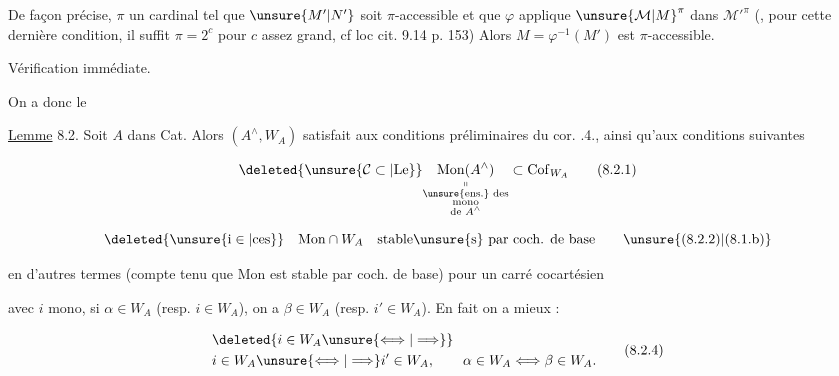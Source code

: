 
De façon précise,  $\pi$ un cardinal tel que
$\unsure{M'|N'}$ soit $\pi$-accessible et que $\varphi$ applique
$\unsure{\mathcal{M}|M}^\pi$ dans ${\mathcal{M}'}^\pi$ (, pour cette dernière
condition, il suffit $\pi=2^c$ pour $c$ assez
grand, cf loc cit. 9.14 p. 153) Alors 
$M=\varphi^{-1}(M')$ est $\pi$-accessible.

Vérification immédiate.

On a donc le

\uline{Lemme} 8.2. Soit $A$ dans Cat. Alors $(A^\wedge,W_A)$
satisfait aux conditions préliminaires du
cor. .4., ainsi qu'aux conditions suivantes

\[
 \deleted{\unsure{\mathcal C\subset|\mathrm{Le}}}
 \underset{\substack{\shortparallel\\\text{\unsure{ens.} des}\\\text{mono}\\\text{de } A^\wedge}}
 {\mathrm{Mon}(A^\wedge)}\subset\mathrm{Cof}_{W_A}
 \tag*{(8.2.1)}
\]

\[
 \deleted{\unsure{\mathrm i\in|\mathrm{ces}}}\quad \mathrm{Mon}\cap W_A
 \quad\text{stable\unsure{s} par coch. de base}
 \tag*{\unsure{(8.2.2)|(8.1.b)}}
\]

en d'autres termes (compte tenu que Mon est stable par coch. de base) pour
un carré cocartésien


avec $i$ mono, si $\alpha\in W_A$ (resp. $i\in W_A$),
on a $\beta\in W_A$ (resp. $i'\in W_A$). En fait
on a mieux : 

\[
 \begin{aligned}
 &\deleted{i\in W_A\unsure{\Longleftrightarrow|\Longrightarrow}}\\
 &i\in W_A\unsure{\Longleftrightarrow|\Longrightarrow} i'\in W_A,\qquad
 \alpha\in W_A\Longleftrightarrow\beta\in W_A.
 \end{aligned}
 \tag*{(8.2.4)}
\]
